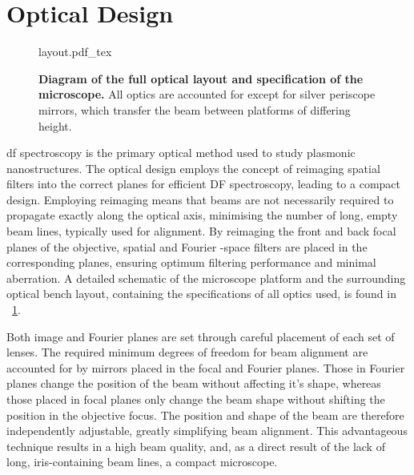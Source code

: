 \documentclass{article}
\begin{document}
\section{Optical Design}

\begin{figure}[p]
\centering
\fontsize{9.5pt}{1em}\selectfont
\def\svgwidth{0.93\textwidth}
{layout.pdf_tex}
\caption[Diagram of the full optical layout]{\textbf{Diagram of the full optical layout and specification of the microscope.} All optics are accounted for except for silver periscope mirrors, which transfer the beam between platforms of differing height.}
\label{fig:layout}
\end{figure}

\Gls{df} spectroscopy is the primary optical method used to study plasmonic nanostructures. The optical design employs the concept of reimaging spatial filters into the correct planes for efficient DF spectroscopy, leading to a compact design. Employing reimaging means that beams are not necessarily required to propagate exactly along the optical axis, minimising the number of long, empty beam lines, typically used for alignment. By reimaging the front and back focal planes of the objective, spatial and Fourier \wvm-space filters are placed in the corresponding planes, ensuring optimum filtering performance and minimal aberration. A detailed schematic of the microscope platform and the surrounding optical bench layout, containing the specifications of all optics used, is found in \figurename~\ref{fig:layout}.

Both image and Fourier planes are set through careful placement of each set of lenses. The required minimum degrees of freedom for beam alignment are accounted for by mirrors placed in the focal and Fourier planes. Those in Fourier planes change the position of the beam without affecting it's shape, whereas those placed in focal planes only change the beam shape without shifting the position in the objective focus. The position and shape of the beam are therefore independently adjustable, greatly simplifying beam alignment. This advantageous technique results in a high beam quality, and, as a direct result of the lack of long, iris-containing beam lines, a compact microscope.
\end{document}
